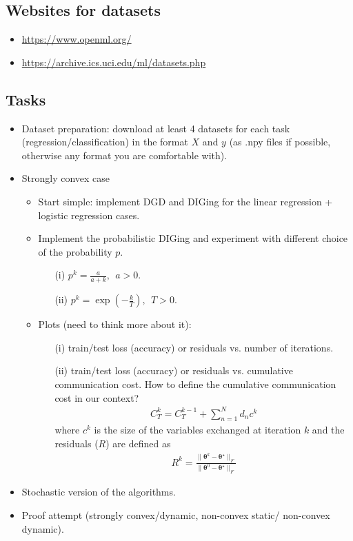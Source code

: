 \documentclass[12pt,draftclsnofoot,onecolumn]{IEEEtran}
\begin{document}
\subsection{Websites for datasets}
\begin{itemize}
\item \url{https://www.openml.org/}
\item \url{https://archive.ics.uci.edu/ml/datasets.php}
\end{itemize}

\subsection{Tasks}
\begin{itemize}
\item Dataset preparation: download at least 4 datasets for each task (regression/classification) in the format $X$ and $y$ (as .npy files if possible, otherwise any format you are comfortable with).
\item Strongly convex case
\begin{itemize}
\item Start simple: implement DGD and DIGing for the linear regression + logistic regression cases.
\item Implement the probabilistic DIGing and experiment with different choice of the probability $p$.
\begin{itemize}
\item[(i)] $p^k = \frac{a}{a + k}, ~~ a > 0$.
\item[(ii)] $p^k = \exp\left(-\frac{k}{T}\right), ~~ T > 0$.
\end{itemize}
\item Plots (need to think more about it): 
\begin{itemize}
\item[(i)] train/test loss (accuracy) or residuals vs. number of iterations.
\item[(ii)] train/test loss (accuracy) or residuals vs. cumulative communication cost. How to define the cumulative communication cost in our context?
\begin{align}
C_T^k = C_T^{k-1} + \sum_{n=1}^N d_n c^k
\end{align}
where $c^k$ is the size of the variables exchanged at iteration $k$ and the residuals ($R$) are defined as
\begin{align}
R^k = \frac{\|\bm{\theta}^k - \bm{\theta}^{\star}\|_F}{\|\bm{\theta}^0 - \bm{\theta}^{\star}\|_F}
\end{align}
\end{itemize}
\end{itemize}
\item Stochastic version of the algorithms.
\item Proof attempt (strongly convex/dynamic, non-convex static/ non-convex dynamic).
\end{itemize}

%
%
%
%
%
%

%
%
\end{document}
